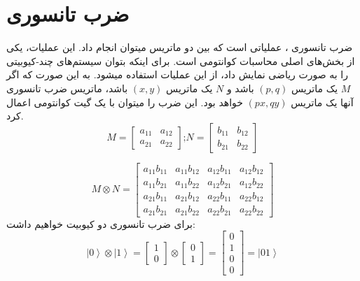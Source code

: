 \section{ضرب تانسوری}
ضرب تانسوری
، عملیاتی است که بین دو ماتریس میتوان انجام داد. این عملیات، یکی از بخش‌های اصلی محاسبات کوانتومی است. برای اینکه بتوان سیستم‌های چند-کیوبیتی
را به صورت ریاضی نمایش داد، از این عملیات استفاده میشود. به این صورت که اگر $M$ یک ماتریس $(p,q)$ باشد و  $N$ یک ماتریس $(x,y)$ باشد، ماتریس ضرب تانسوری آنها یک ماتریس $(px,qy)$ خواهد بود. 
\cite{fundamentalsandapplications}
این ضرب را میتوان با یک گیت کوانتومی
 اعمال کرد.
\begin{equation}
M =  \begin{bmatrix}
 a_{11} &  a_{12}
\\
 a_{21} & a_{22}
\end{bmatrix}
\text{;}
N =  \begin{bmatrix}
 b_{11} &  b_{12}
\\
 b_{21} &  b_{22}
\end{bmatrix}
\end{equation}

\begin{equation}
M \otimes  N =  \begin{bmatrix}
 a_{11}b_{11} &  a_{11}b_{12} &  a_{12}b_{11} &  a_{12}b_{12}
\\
 a_{11}b_{21} &  a_{11}b_{22} &  a_{12}b_{21} &  a_{12}b_{22}
\\
 a_{21}b_{11} &  a_{21}b_{12} &  a_{22}b_{11} &  a_{22}b_{12}
\\
 a_{21}b_{21} &  a_{21}b_{22} &  a_{22}b_{21} &  a_{22}b_{22}
\end{bmatrix}
\end{equation}
برای ضرب تانسوری دو کیوبیت خواهیم داشت:
\begin{equation}
\left|0\right\rangle  \otimes  \left|1\right\rangle  =
\begin{bmatrix}
1 \\ 0 
\end{bmatrix} 
\otimes
\begin{bmatrix}
0 \\ 1 
\end{bmatrix} 
=
  \begin{bmatrix}
0
\\
1
\\
0
\\
0
\end{bmatrix} = \left|01\right\rangle
\end{equation}


